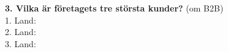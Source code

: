 \documentclass[10pt]{beamer}
\begin{document}
\begin{frame}[label=riskfragor-steg3]
  \textbf{3. Vilka är företagets tre största kunder?} (om B2B)\\
  1. \underline{\hspace{5cm}} Land: \underline{\hspace{2cm}}\\
  2. \underline{\hspace{5cm}} Land: \underline{\hspace{2cm}}\\
  3. \underline{\hspace{5cm}} Land: \underline{\hspace{2cm}}

  \vspace{0.5cm}
  \begin{flushright}
    \hyperlink{riskfragor-steg2}{} \hspace{0.3cm} \hyperlink{riskfragor-steg4}{}
  \end{flushright}
\end{frame}
\end{document}
